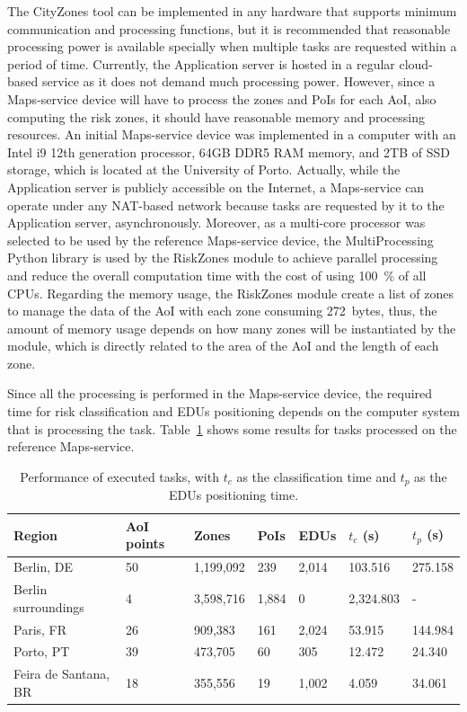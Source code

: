 \begin{refsection}
The CityZones tool can be implemented in any hardware that supports minimum communication and processing functions, but it is recommended that reasonable processing power is available specially when multiple tasks are requested within a period of time. Currently, the Application server is hosted in a regular cloud-based service as it does not demand much processing power. However, since a Maps-service device will have to process the zones and PoIs for each AoI, also computing the risk zones, it should have reasonable memory and processing resources. An initial Maps-service device was implemented in a computer with an Intel i9 12th generation processor, 64GB DDR5 RAM memory, and 2TB of SSD storage, which is located at the University of Porto. Actually, while the Application server is publicly accessible on the Internet, a Maps-service can operate under any NAT-based network because tasks are requested by it to the Application server, asynchronously. Moreover, as a multi-core processor was selected to be used by the reference Maps-service device, the MultiProcessing Python library is used by the RiskZones module to achieve parallel processing and reduce the overall computation time with the cost of using 100~\% of all CPUs. Regarding the memory usage, the RiskZones module create a list of zones to manage the data of the AoI with each zone consuming 272~bytes, thus, the amount of memory usage depends on how many zones will be instantiated by the module, which is directly related to the area of the AoI and the length of each zone.

Since all the processing is performed in the Maps-service device, the required time for risk classification and EDUs positioning depends on the computer system that is processing the task. Table~\ref{tab:performance} shows some results for tasks processed on the reference Maps-service. 

\begin{table}[htbp]
  \centering
  \begin{tabular}{p{2.3cm}llllll}
    \hline
    \textbf{Region}         & \textbf{AoI points} & \textbf{Zones} & \textbf{PoIs} & \textbf{EDUs} & \textbf{$t_c$ (s)} & \textbf{$t_p$ (s)} \\
    \hline
    Berlin, DE              & 50         & 1,199,092 & 239    & 2,014  & 103.516   & 275.158 \\
    Berlin surroundings     & 4          & 3,598,716 & 1,884  & 0      & 2,324.803 & - \\
    Paris, FR               & 26         & 909,383   & 161    & 2,024  & 53.915    & 144.984 \\
    Porto, PT               & 39         & 473,705   & 60     & 305    & 12.472    & 24.340 \\
    Feira de Santana, BR    & 18         & 355,556   & 19     & 1,002  & 4.059     & 34.061 \\
    \hline
  \end{tabular}
  \caption{Performance of executed tasks, with $t_c$ as the classification time and $t_p$ as the EDUs positioning time.}\label{tab:performance}
\end{table}


\end{refsection}
